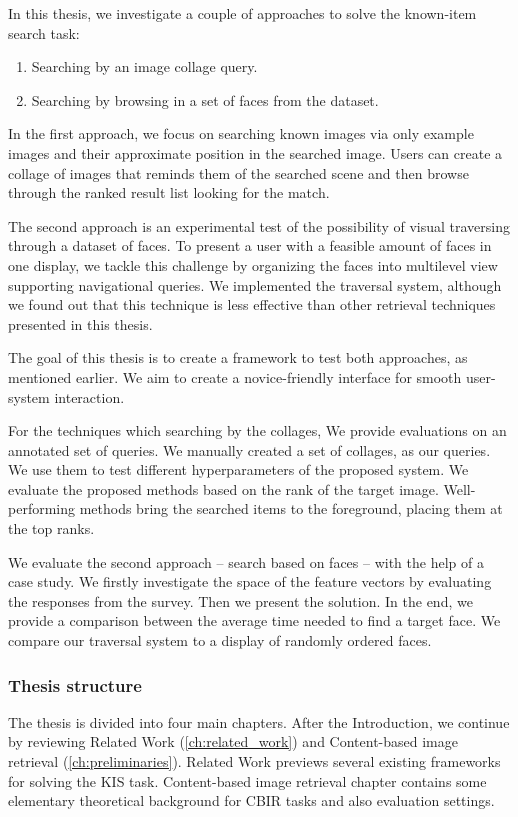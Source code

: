 In this thesis, we investigate a couple of approaches to solve the known-item search task:

\begin{enumerate}
  \item Searching by an image collage query.
  \item Searching by browsing in a set of faces from the dataset.
\end{enumerate}

In the first approach, we focus on searching known images via only example images and their approximate position in the searched image. Users can create a collage of images that reminds them of the searched scene and then browse through the ranked result list looking for the match.

The second approach is an experimental test of the possibility of visual traversing through a dataset of faces. To present a user with a feasible amount of faces in one display, we tackle this challenge by organizing the faces into multilevel view supporting navigational queries. We implemented the traversal system, although we found out that this technique is less effective than other retrieval techniques presented in this thesis.

The goal of this thesis is to create a framework to test both approaches, as mentioned earlier. We aim to create a novice-friendly interface for smooth user-system interaction.

For the techniques which searching by the collages, We provide evaluations on an annotated set of queries. We manually created a set of collages, as our queries. We use them to test different hyperparameters of the proposed system. We evaluate the proposed methods based on the rank of the target image. Well-performing methods bring the searched items to the foreground, placing them at the top ranks.

We evaluate the second approach -- search based on faces -- with the help of a case study. We firstly investigate the space of the feature vectors by evaluating the responses from the survey. Then we present the solution. In the end, we provide a comparison between the average time needed to find a target face. We compare our traversal system to a display of randomly ordered faces.

\subsubsection*{Thesis structure}
The thesis is divided into four main chapters. After the Introduction, we continue by reviewing Related Work (\autoref{ch:related_work}) and Content-based image retrieval (\autoref{ch:preliminaries}). Related Work previews several existing frameworks for solving the KIS task. Content-based image retrieval chapter contains some elementary theoretical background for CBIR tasks and also evaluation settings.

